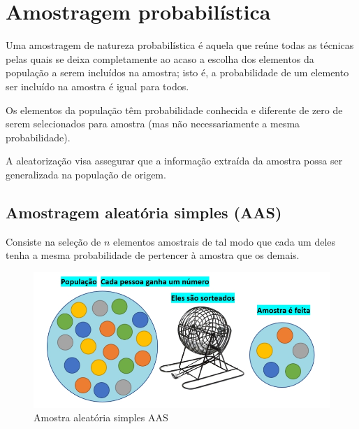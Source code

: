 \documentclass[
]{book}
\begin{document}
\hfill\break

\hypertarget{amostragem-probabiluxedstica}{%
\section{Amostragem probabilística}\label{amostragem-probabiluxedstica}}

\hfill\break

Uma amostragem de natureza probabilística é aquela que reúne todas as técnicas pelas quais se deixa completamente ao acaso a escolha dos elementos da população a serem incluídos na amostra; isto é, a probabilidade de um elemento ser incluído na amostra é igual para todos.

\hfill\break

Os elementos da população têm probabilidade conhecida e diferente de zero de serem selecionados para amostra (mas não necessariamente a mesma probabilidade).

\hfill\break

A aleatorização visa assegurar que a informação extraída da amostra possa ser generalizada na população de origem.

\hypertarget{amostragem-aleatuxf3ria-simples-aas}{%
\subsection{Amostragem aleatória simples (AAS)}\label{amostragem-aleatuxf3ria-simples-aas}}

\hfill\break

Consiste na seleção de \(n\) elementos amostrais de tal modo que cada um deles tenha a mesma probabilidade de pertencer à amostra que os demais.

\hfill\break

\begin{figure}

{\centering \includegraphics[width=0.8\linewidth]{images7/aas} 

}

\caption{Amostra aleatória simples AAS}\label{fig:fig03}
\end{figure}
\end{document}
